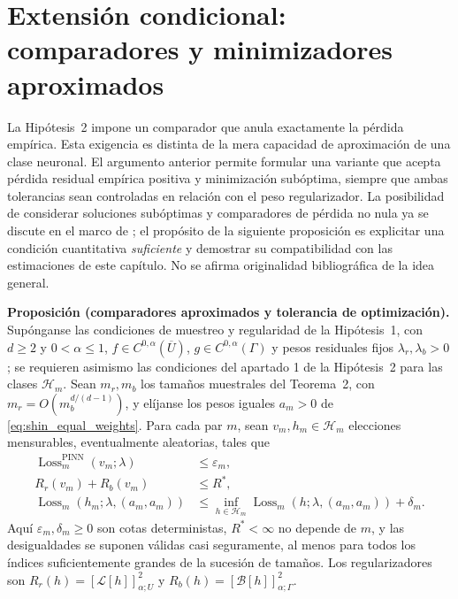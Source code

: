 \section{Extensión condicional: comparadores y minimizadores aproximados}
\label{sec:comparadores_aproximados}

La Hipótesis~2 impone un comparador que anula exactamente la pérdida
empírica. Esta exigencia es distinta de la mera capacidad de aproximación de
una clase neuronal. El argumento anterior permite formular una variante que
acepta pérdida residual empírica positiva y minimización subóptima, siempre
que ambas tolerancias sean controladas en relación con el peso regularizador.
La posibilidad de considerar soluciones subóptimas y comparadores de pérdida
no nula ya se discute en el marco de \cite{shin2020convergence}; el propósito
de la siguiente proposición es explicitar una condición cuantitativa
\emph{suficiente} y demostrar su compatibilidad con las estimaciones de este
capítulo. No se afirma originalidad bibliográfica de la idea general.

\medskip
\noindent\textbf{Proposición (comparadores aproximados y tolerancia de optimización).}
Supónganse las condiciones de muestreo y regularidad de la Hipótesis~1,
con $d\geq2$ y $0<\alpha\leq1$, $f\in C^{0,\alpha}(\overline U)$,
$g\in C^{0,\alpha}(\Gamma)$ y pesos residuales fijos
$\lambda_r,\lambda_b>0$; se requieren asimismo las condiciones del
apartado 1 de la Hipótesis~2 para las clases $\mathcal H_m$. Sean $m_r,m_b$ los tamaños
muestrales del Teorema~2, con
$m_r=O(m_b^{d/(d-1)})$, y elíjanse los pesos iguales
$a_m>0$ de \eqref{eq:shin_equal_weights}. Para cada par $m$, sean
$v_m,h_m\in\mathcal H_m$ elecciones mensurables, eventualmente
aleatorias, tales que
\begin{align}
\operatorname{Loss}^{\mathrm{PINN}}_m(v_m;\lambda)
 &\leq\varepsilon_m, \label{eq:aprox_comparador_loss}\\
R_r(v_m)+R_b(v_m)&\leq R^*,\label{eq:aprox_comparador_holder}\\
\operatorname{Loss}_m(h_m;\lambda,(a_m,a_m))
 &\leq \inf_{h\in\mathcal H_m}
 \operatorname{Loss}_m(h;\lambda,(a_m,a_m))+\delta_m.
 \label{eq:aprox_minimizador}
\end{align}
Aquí $\varepsilon_m,\delta_m\geq0$ son cotas deterministas,
$R^*<\infty$ no depende de $m$, y las desigualdades se suponen
válidas casi seguramente, al menos para todos los índices suficientemente
grandes de la sucesión de tamaños. Los regularizadores son
$R_r(h)=[\mathcal L[h]]_{\alpha;U}^2$ y
$R_b(h)=[\mathcal B[h]]_{\alpha;\Gamma}^2$.

